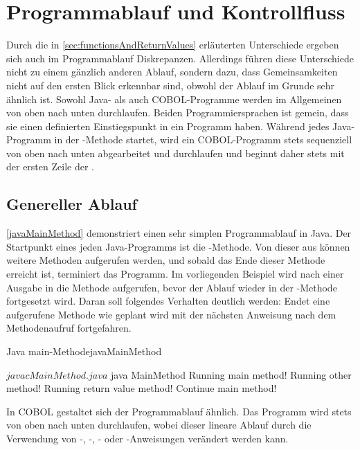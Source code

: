 \section{Programmablauf und Kontrollfluss}\label{programmablauf}
Durch die in \autoref{sec:functionsAndReturnValues} erläuterten Unterschiede ergeben sich auch im Programmablauf Diskrepanzen. Allerdings führen diese Unterschiede nicht zu einem gänzlich anderen Ablauf, sondern dazu, dass Gemeinsamkeiten nicht auf den ersten Blick erkennbar sind, obwohl der Ablauf im Grunde sehr ähnlich ist. Sowohl Java- als auch COBOL-Programme werden im Allgemeinen von oben nach unten durchlaufen. Beiden Programmiersprachen ist gemein, dass sie einen definierten Einstiegspunkt in ein Programm haben. Während jedes Java-Programm in der -Methode startet, wird ein COBOL-Programm stets sequenziell von oben nach unten abgearbeitet und durchlaufen und beginnt daher stets mit der ersten Zeile der .

\subsection{Genereller Ablauf} \label{generalablauf}

\autoref{javaMainMethod} demonstriert einen sehr simplen Programmablauf in Java. Der Startpunkt eines jeden Java-Programms ist die -Methode. Von dieser aus können weitere Methoden aufgerufen werden, und sobald das Ende dieser Methode erreicht ist, terminiert das Programm. Im vorliegenden Beispiel wird nach einer Ausgabe in  die Methode  aufgerufen, bevor der Ablauf wieder in der -Methode fortgesetzt wird. Daran soll folgendes Verhalten deutlich werden: Endet eine aufgerufene Methode wie geplant wird mit der nächsten Anweisung nach dem Methodenaufruf fortgefahren. 

\begin{codeWithCaption}{Java main-Methode}{javaMainMethod}
\begin{shellwindow}
$ javac MainMethod.java 
$ java MainMethod
Running main method!
Running other method!
Running return value method!
Continue main method!
\end{shellwindow}
\end{codeWithCaption}

In COBOL gestaltet sich der Programmablauf ähnlich. Das Programm wird stets von oben nach unten durchlaufen, wobei dieser lineare Ablauf \zB durch die Verwendung von -, -, - oder -Anweisungen verändert werden kann.

